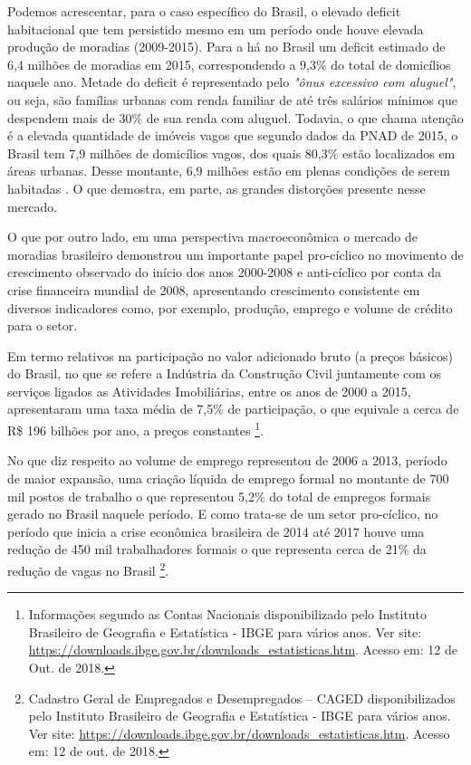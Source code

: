 Podemos acrescentar, para o caso específico do Brasil, o elevado deficit habitacional que tem persistido mesmo em um período onde houve elevada produção de moradias (2009-2015). Para a  há no Brasil um deficit estimado de 6,4 milhões de moradias em 2015, correspondendo a 9,3\% do total de domicílios naquele ano. Metade do deficit é representado pelo \textit{"ônus excessivo com aluguel"}, ou seja, são famílias urbanas com renda familiar de até três salários mínimos que despendem mais de 30\% de sua renda com aluguel. Todavia, o que chama atenção é a elevada quantidade de imóveis vagos que segundo dados da PNAD de 2015, o Brasil tem 7,9 milhões de domicílios vagos, dos quais 80,3\% estão localizados em áreas urbanas. Desse montante, 6,9 milhões estão em plenas condições de serem habitadas \cite{ibge2015b}. O que demostra, em parte, as grandes distorções presente nesse mercado.

O que por outro lado, em uma perspectiva macroeconômica o mercado de moradias brasileiro demonstrou um importante papel pro-cíclico no movimento de crescimento observado do início dos anos 2000-2008 e anti-cíclico por conta da crise financeira mundial de 2008, apresentando crescimento consistente em diversos indicadores como, por exemplo, produção, emprego e volume de crédito para o setor. 

Em termo relativos na participação no valor adicionado bruto (a preços básicos) do Brasil, no que se refere a Indústria da Construção Civil juntamente com os serviços ligados as Atividades Imobiliárias, entre os anos de 2000 a 2015, apresentaram uma taxa média de 7,5\% de participação, o que equivale a cerca de R\$ 196 bilhões por ano, a preços constantes \footnote{Informações segundo as Contas Nacionais disponibilizado pelo Instituto Brasileiro de Geografia e Estatística - IBGE para vários anos. Ver site: \url{https://downloads.ibge.gov.br/downloads_estatisticas.htm}. Acesso em: 12 de Out. de 2018.}.

No que diz respeito ao volume de emprego representou de 2006 a 2013, período de maior expansão, uma criação líquida de emprego formal no montante de 700 mil postos de trabalho o que representou 5,2\% do total de empregos formais gerado no Brasil naquele período. E como trata-se de um setor pro-cíclico, no período que inicia a crise econômica brasileira de 2014 até 2017 houve uma redução de 450 mil trabalhadores formais o que representa cerca de 21\% da redução de vagas no Brasil \footnote{Cadastro Geral de Empregados e Desempregados – CAGED disponibilizados pelo Instituto Brasileiro de Geografia e Estatística - IBGE para vários anos. Ver site: \url{https://downloads.ibge.gov.br/downloads_estatisticas.htm}. Acesso em: 12 de out. de 2018.}.

